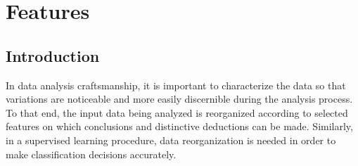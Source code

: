 









\chapter{Features}\label{ch:features}
\section{Introduction}
In data analysis craftsmanship,
it is important to characterize the data so that
variations are noticeable and more easily discernible
during the analysis process.
To that end, the input data being analyzed is reorganized
according to selected features on which
conclusions and distinctive deductions can be made.
Similarly, in a supervised learning 
procedure, data reorganization is needed
in order to make classification decisions accurately. 

